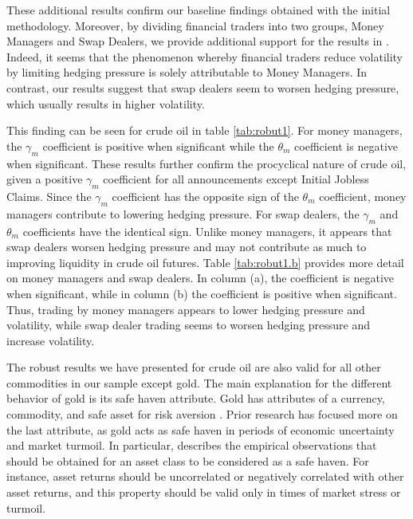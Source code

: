 \documentclass[12pt]{article}
\begin{document}
These additional results confirm our baseline findings obtained with the initial methodology. Moreover, by dividing financial traders into two groups, Money Managers and Swap Dealers, we provide additional support for the results in \citet{brunetti2016speculators}. Indeed, it seems that the phenomenon whereby financial traders reduce volatility by limiting hedging pressure is solely attributable to Money Managers. In contrast, our results suggest that swap dealers seem to worsen hedging pressure, which usually results in higher volatility.

 
This finding can be seen for crude oil in table \ref{tab:robut1}. For money managers, the  $\gamma_m$ coefficient is positive when significant while the  $\theta_m$ coefficient is negative when significant. These results further confirm the procyclical nature of crude oil, given a positive $\gamma_m$ coefficient for all announcements except Initial Jobless Claims. Since the $\gamma_m$ coefficient has the opposite sign of the $\theta_m$ coefficient, money managers contribute to lowering hedging pressure. For swap dealers,   the $\gamma_m$ and $\theta_m$ coefficients  have the identical sign.  Unlike  money managers, it appears that swap dealers worsen hedging pressure and may not contribute as much to improving liquidity in crude oil futures.  Table \ref{tab:robut1.b} provides more detail on money managers and swap dealers. In column (a), the coefficient is negative when significant, while in column (b) the coefficient is positive when significant. Thus, trading by money managers appears to lower hedging pressure and volatility, while swap dealer trading seems to worsen hedging pressure and increase volatility.%

The robust results we have presented for crude oil are also valid for all other commodities in our sample except gold. The main explanation for the different behavior of gold is its safe haven attribute. Gold has attributes of a currency,  commodity, and safe asset for risk aversion \citep{wu2019does}. Prior research has focused more on the last attribute, as gold acts as safe haven in periods of economic uncertainty and market turmoil.  In particular, \citet{baur2010gold} describes the empirical observations that should be obtained for an asset class to be considered as a safe haven. For instance, asset returns should be uncorrelated or negatively correlated with other asset returns, and this property should be valid only in times of market stress or turmoil. 
\end{document}
